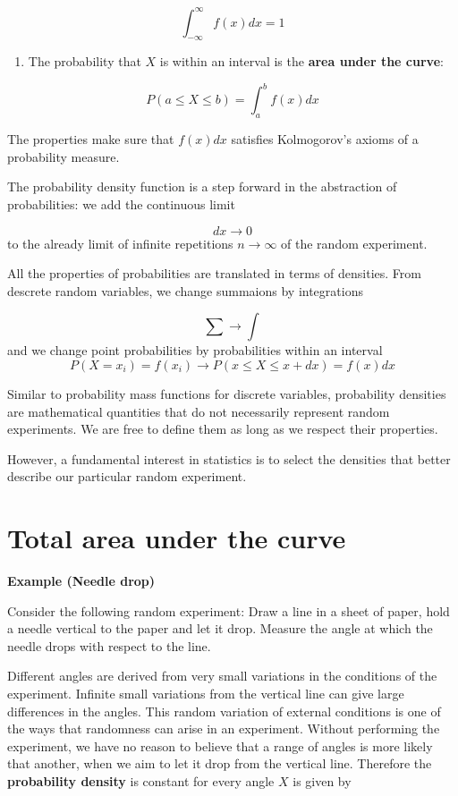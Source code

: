 \documentclass[
]{book}
\providecommand{\tightlist}{%
  \setlength{\itemsep}{0pt}\setlength{\parskip}{0pt}}
\begin{document}
\[\int_{-\infty}^{\infty} f(x) dx = 1\]

\begin{enumerate}
\def\labelenumi{\arabic{enumi})}
\setcounter{enumi}{2}
\tightlist
\item
  The probability that \(X\) is within an interval is the \textbf{area under the curve}:
\end{enumerate}

\[P(a\leq X \leq b)=\int_{a}^{b} f(x) dx\]

The properties make sure that \(f(x)dx\) satisfies Kolmogorov's axioms of a probability measure.

The probability density function is a step forward in the abstraction of probabilities: we add the continuous limit

\[dx \rightarrow 0\]
to the already limit of infinite repetitions \(n \rightarrow \infty\) of the random experiment.

All the properties of probabilities are translated in terms of densities. From descrete random variables, we change summaions by integrations

\[\sum \rightarrow \int\]
and we change point probabilities by probabilities within an interval \[P(X=x_i)=f(x_i) \rightarrow P(x\leq X \leq x+dx)= f(x)dx\]

Similar to probability mass functions for discrete variables, probability densities are mathematical quantities that do not necessarily represent random experiments. We are free to define them as long as we respect their properties.

However, a fundamental interest in statistics is to select the densities that better describe our particular random experiment.

\hypertarget{total-area-under-the-curve}{%
\section{Total area under the curve}\label{total-area-under-the-curve}}

\textbf{Example (Needle drop)}

Consider the following random experiment: Draw a line in a sheet of paper, hold a needle vertical to the paper and let it drop. Measure the angle at which the needle drops with respect to the line.

Different angles are derived from very small variations in the conditions of the experiment. Infinite small variations from the vertical line can give large differences in the angles. This random variation of external conditions is one of the ways that randomness can arise in an experiment. Without performing the experiment, we have no reason to believe that a range of angles is more likely that another, when we aim to let it drop from the vertical line. Therefore the \textbf{probability density} is constant for every angle \(X\) is given by
\end{document}
